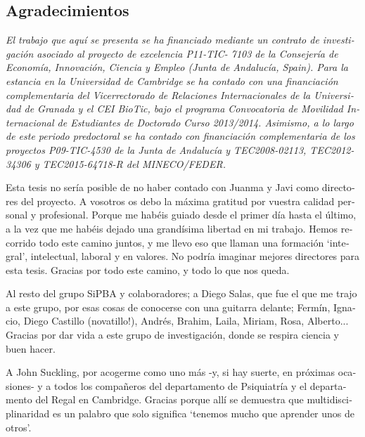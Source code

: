 

\begin{otherlanguage}{spanish}
	\chapter*{Agradecimientos}
	\textit{El trabajo que aquí se presenta se ha financiado mediante un contrato de investigación asociado al proyecto de excelencia P11-TIC- 7103 de la Consejer\'ia de Econom\'ia, Innovaci\'on, Ciencia y Empleo (Junta de Andaluc\'ia, Spain). Para la estancia en la Universidad de Cambridge se ha contado con una financiación complementaria del Vicerrectorado de Relaciones Internacionales de la Universidad de Granada y el CEI BioTic, bajo el programa Convocatoria de Movilidad Internacional de Estudiantes de Doctorado Curso 2013/2014. Asimismo, a lo largo de este periodo predoctoral se ha contado con financiación complementaria de los proyectos P09-TIC-4530 de la Junta de Andalucía y TEC2008-02113, TEC2012-34306 y TEC2015-64718-R del MINECO/FEDER.}
	\bigskip
	
	Esta tesis no sería posible de no haber contado con Juanma y Javi como directores del proyecto. A vosotros os debo la máxima gratitud por vuestra calidad personal y profesional. Porque me habéis guiado desde el primer día hasta el último, a la vez que me habéis dejado una grandísima libertad en mi trabajo. Hemos recorrido todo este camino juntos, y me llevo eso que llaman una formación `integral', intelectual, laboral y en valores. No podría imaginar mejores directores para esta tesis. Gracias por todo este camino, y todo lo que nos queda. 
	
	Al resto del grupo SiPBA y colaboradores; a Diego Salas, que fue el que me trajo a este grupo, por esas cosas de conocerse con una guitarra delante; Fermín, Ignacio, Diego Castillo (novatillo!), Andrés, Brahim, Laila, Miriam, Rosa, Alberto... Gracias por dar vida a este grupo de investigación, donde se respira ciencia y buen hacer. 
	
	A John Suckling, por acogerme como uno más -y, si hay suerte, en próximas ocasiones- y a todos los compañeros del departamento de Psiquiatría y el departamento del Regal en Cambridge. Gracias porque allí se demuestra que multidisciplinaridad es un palabro que solo significa `tenemos mucho que aprender unos de otros'. 
	

\end{otherlanguage}
